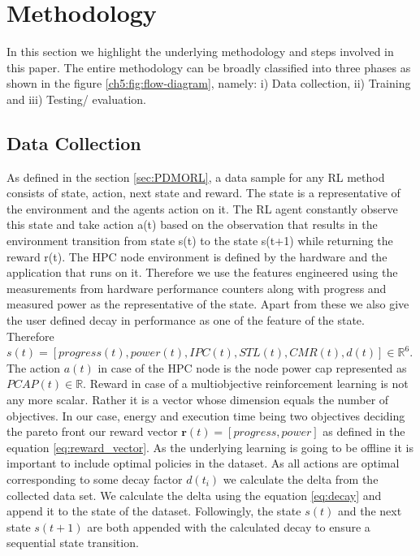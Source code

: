 \section{Methodology}
In this section we highlight the underlying methodology and steps involved in this paper. The entire methodology can be broadly classified into three phases as shown in the figure \ref{ch5:fig:flow-diagram}, namely: i) Data collection, ii) Training and iii) Testing/ evaluation.

\subsection{Data Collection}
As defined in the section \ref{sec:PDMORL}, a data sample for any RL method consists of state, action, next state and reward. The state is a representative of the environment and the agents action on it. The RL agent constantly observe this state and take action a(t) based on the observation that results in the environment transition from state s(t) to the state s(t+1) while returning the reward r(t). The HPC node environment is defined by the hardware and the application that runs on it. Therefore we use the features engineered using the measurements from hardware performance counters along with progress and measured power as the representative of the state. Apart from these we also give the user defined decay in performance as one of the feature of the state. Therefore $s(t) = [progress(t), power(t), IPC(t), STL(t), CMR(t), d(t)] \in \mathbb{R}^{6}$. The action $a(t)$ in case of the HPC node is the node power cap represented as $PCAP(t) \in \mathbb{R}$. Reward in case of a multiobjective reinforcement learning is not any more scalar. Rather it is a vector whose dimension equals the number of objectives. In our case, energy and execution time being two objectives deciding the pareto front our reward vector $\mathbf{r}(t) = [progress, power]$ as defined in the equation \ref{eq:reward_vector}. As the underlying learning is going to be offline it is important to include optimal policies in the dataset. As all actions are optimal corresponding to some decay factor $d(t_i)$ we calculate the delta from the collected data set. We calculate the delta using the equation \ref{eq:decay} and append it to the state of the dataset. Followingly, the state $s(t)$ and the next state $s(t+1)$ are both appended with the calculated decay to ensure a sequential state transition.  

